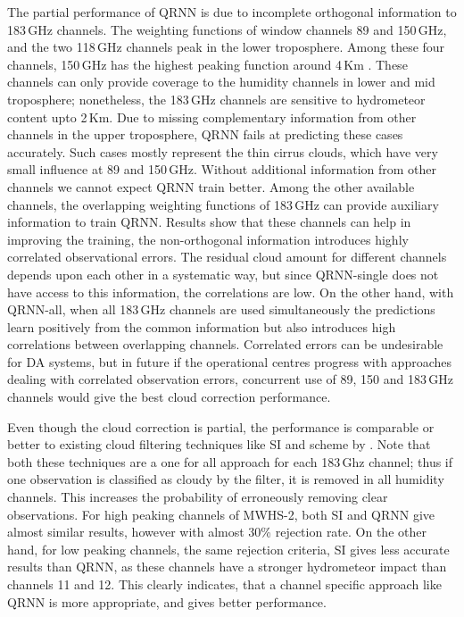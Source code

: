 \documentclass[amt, manuscript]{copernicus}
\begin{document}
The partial performance of QRNN is due to incomplete orthogonal information to 183\,GHz channels.  The weighting functions of window channels 89 and 150\,GHz, and the two 118\,GHz channels peak in the lower troposphere. Among these four channels, 150\,GHz has the highest peaking function around 4\,Km \cite{chen2020mwhs}. These channels can only provide coverage to the humidity channels in lower and mid troposphere; nonetheless, the 183\,GHz channels are sensitive to hydrometeor content upto 2\,Km. Due to missing complementary information from other channels in the upper troposphere, QRNN fails at predicting these cases accurately. Such cases mostly represent the thin cirrus clouds, which have very small influence at 89 and 150\,GHz. Without additional information from other channels we cannot expect QRNN train better. Among the other available channels, the overlapping weighting functions of 183\,GHz can provide auxiliary information to train QRNN. Results show that these channels can help in improving the training, the non-orthogonal information introduces highly correlated observational errors. The residual cloud amount for different channels depends upon each other in a systematic way, but since QRNN-single does not have access to this information, the correlations are low. On the other hand, with QRNN-all, when all 183\,GHz channels are used simultaneously the predictions learn positively from the common information but also introduces high correlations between overlapping channels. Correlated errors can be undesirable for DA systems, but in future if the operational centres progress with approaches dealing with correlated observation errors, concurrent use of  89, 150 and 183\,GHz channels would give the best cloud correction performance.

Even though the cloud correction is partial, the performance is comparable or better to existing cloud filtering techniques like SI and scheme by \cite{buehler:aclou:07}. Note that both these techniques are a one for all approach for each 183\,Ghz channel; thus if one observation is classified as cloudy by the filter, it is removed in all humidity channels. This increases the probability of erroneously removing clear observations. For high peaking channels of MWHS-2, both SI and QRNN give almost similar results, however with almost 30\% rejection rate. On the other hand, for low peaking channels, the same rejection criteria, SI gives less accurate results than QRNN, as these channels have a stronger hydrometeor impact than channels 11 and 12. This clearly indicates, that a channel specific approach like QRNN is more appropriate, and gives better performance. 
\end{document}
